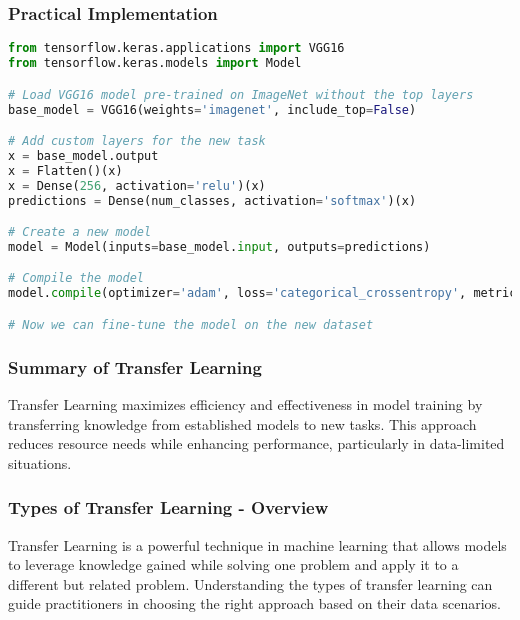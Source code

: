 \documentclass[aspectratio=169]{beamer}
\begin{document}
\begin{frame}[fragile]
  \frametitle{Practical Implementation}
  \begin{lstlisting}[language=Python]
from tensorflow.keras.applications import VGG16
from tensorflow.keras.models import Model

# Load VGG16 model pre-trained on ImageNet without the top layers
base_model = VGG16(weights='imagenet', include_top=False)

# Add custom layers for the new task
x = base_model.output
x = Flatten()(x)
x = Dense(256, activation='relu')(x)
predictions = Dense(num_classes, activation='softmax')(x)

# Create a new model
model = Model(inputs=base_model.input, outputs=predictions)

# Compile the model
model.compile(optimizer='adam', loss='categorical_crossentropy', metrics=['accuracy'])

# Now we can fine-tune the model on the new dataset
  \end{lstlisting}
\end{frame}

\begin{frame}[fragile]
  \frametitle{Summary of Transfer Learning}
  Transfer Learning maximizes efficiency and effectiveness in model training by transferring knowledge from established models to new tasks. This approach reduces resource needs while enhancing performance, particularly in data-limited situations.
\end{frame}

\begin{frame}[fragile]
    \frametitle{Types of Transfer Learning - Overview}
    Transfer Learning is a powerful technique in machine learning that allows models to leverage knowledge gained while solving one problem and apply it to a different but related problem. Understanding the types of transfer learning can guide practitioners in choosing the right approach based on their data scenarios.
\end{frame}
\end{document}
